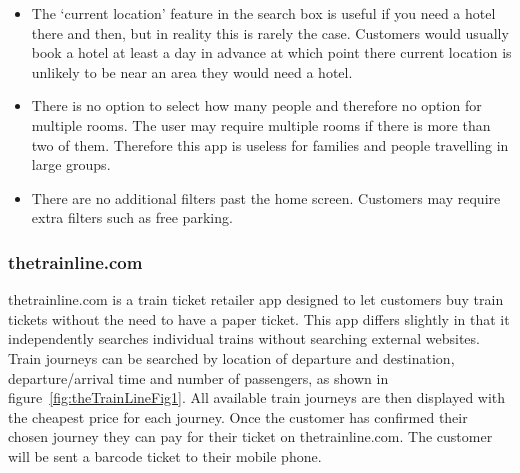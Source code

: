 \begin{itemize}
	\item The `current location' feature in the search box is useful if you
		need a hotel there and then, but in reality this is rarely the case.
		Customers would usually book a hotel at least a day in advance at which
		point there current location is unlikely to be near an area they would
		need a hotel.
	\item There is no option to select how many people and therefore no option
		for multiple rooms. The user may require multiple rooms if there is
		more than two of them. Therefore this app is useless for families and
		people travelling in large groups.
	\item There are no additional filters past the home screen. Customers may
		require extra filters such as free parking.
\end{itemize}

\subsubsection{thetrainline.com}
\label{ssub:thetrainline}

thetrainline.com is a train ticket retailer app designed to let customers buy
train tickets without the need to have a paper ticket. This app differs
slightly in that it independently searches individual trains without searching
external websites. Train journeys can be searched by location of departure and
destination, departure/arrival  time and number of passengers, as shown in
figure~\ref{fig:theTrainLineFig1}. All available train journeys are then
displayed with the cheapest price for each journey.  Once the customer has
confirmed their chosen journey they can pay for their ticket on
thetrainline.com. The customer will be sent a barcode ticket to their mobile
phone.

